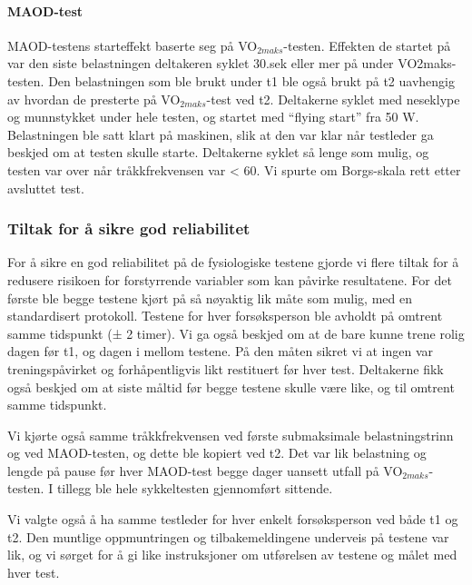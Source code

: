 \documentclass[
  letterpaper,
  DIV=11,
  numbers=noendperiod]{scrartcl}
\let\oldparagraph\paragraph
\renewcommand{\paragraph}[1]{\oldparagraph{#1}\mbox{}}
\begin{document}
\hypertarget{maod-test}{%
\paragraph{MAOD-test}\label{maod-test}}

MAOD-testens starteffekt baserte seg på VO\(_{2maks}\)-testen. Effekten
de startet på var den siste belastningen deltakeren syklet 30.sek eller
mer på under VO2maks-testen. Den belastningen som ble brukt under t1 ble
også brukt på t2 uavhengig av hvordan de presterte på
VO\(_{2maks}\)-test ved t2. Deltakerne syklet med neseklype og
munnstykket under hele testen, og startet med ``flying start'' fra 50 W.
Belastningen ble satt klart på maskinen, slik at den var klar når
testleder ga beskjed om at testen skulle starte. Deltakerne syklet så
lenge som mulig, og testen var over når tråkkfrekvensen var \textless{}
60. Vi spurte om Borgs-skala rett etter avsluttet test.

\hypertarget{tiltak-for-uxe5-sikre-god-reliabilitet}{%
\subsubsection{Tiltak for å sikre god
reliabilitet}\label{tiltak-for-uxe5-sikre-god-reliabilitet}}

For å sikre en god reliabilitet på de fysiologiske testene gjorde vi
flere tiltak for å redusere risikoen for forstyrrende variabler som kan
påvirke resultatene. For det første ble begge testene kjørt på så
nøyaktig lik måte som mulig, med en standardisert protokoll. Testene for
hver forsøksperson ble avholdt på omtrent samme tidspunkt (± 2 timer).
Vi ga også beskjed om at de bare kunne trene rolig dagen før t1, og
dagen i mellom testene. På den måten sikret vi at ingen var
treningspåvirket og forhåpentligvis likt restituert før hver test.
Deltakerne fikk også beskjed om at siste måltid før begge testene skulle
være like, og til omtrent samme tidspunkt.

Vi kjørte også samme tråkkfrekvensen ved første submaksimale
belastningstrinn og ved MAOD-testen, og dette ble kopiert ved t2. Det
var lik belastning og lengde på pause før hver MAOD-test begge dager
uansett utfall på VO\(_{2maks}\)-testen. I tillegg ble hele sykkeltesten
gjennomført sittende.

Vi valgte også å ha samme testleder for hver enkelt forsøksperson ved
både t1 og t2. Den muntlige oppmuntringen og tilbakemeldingene underveis
på testene var lik, og vi sørget for å gi like instruksjoner om
utførelsen av testene og målet med hver test.
\end{document}
